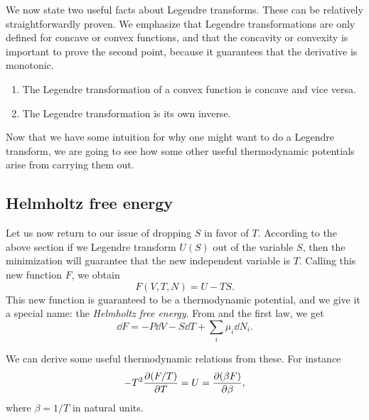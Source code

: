 We now state two useful facts about Legendre transforms. These can
be relatively straightforwardly proven. We emphasize that Legendre
transformations are only defined for concave or convex functions, and
that the concavity or convexity is important to prove the second point,
because it guarantees that the derivative is monotonic.
\begin{proposition}{}{}
  \begin{enumerate}
    \item The Legendre transformation of a convex function is concave
          and vice versa.
    \item The Legendre transformation is its own inverse.
  \end{enumerate}
\end{proposition}

Now that we have some intuition for why one might want to do a
Legendre transform, we are going to see how some other useful
thermodynamic potentials arise from carrying them out.

\subsection{Helmholtz free energy}
Let us now return to our issue of dropping $S$ in favor
of $T$. According to the above section if we
Legendre transform $U(S)$ out of the variable $S$, then the minimization
will guarantee that the new independent variable is $T$. Calling
this new function $F$, we obtain
\begin{equation}\label{eq:helmholtz}
  F(V,T,N)=U-TS.
\end{equation}
This new function is guaranteed to be a thermodynamic potential, and
we give it a special name: the {\it Helmholtz free energy}.
From  and the first law, we get
\begin{equation}\label{eq:helmholtz1st}
  \dd F = -P\dd V -S\dd T +\sum_i\mu_i\dd{N}_i.
\end{equation}

We can derive some useful thermodynamic relations from these. For
instance
\begin{equation}\label{eq:dfdt}
  -T^2\pdv{(F/T)}{T}=U=\pdv{(\beta F)}{\beta},
\end{equation}
where $\beta=1/T$ in natural units.


